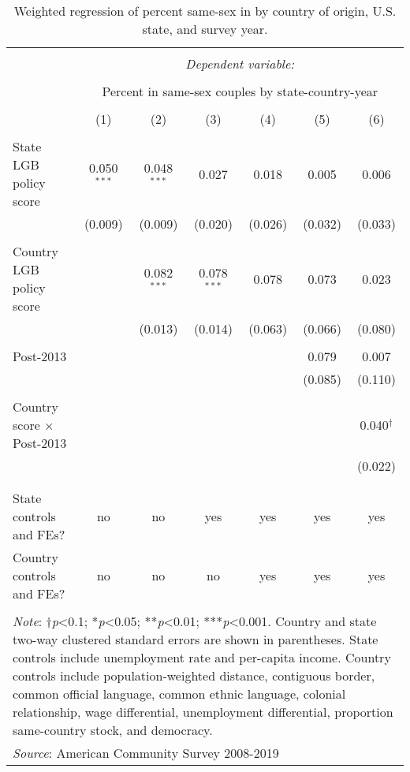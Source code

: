 \documentclass[
  11pt,
]{article}
\begin{document}
\begin{table}[H] \centering 
  \caption{Weighted regression of percent same-sex in by country of origin, U.S. state, and survey year. } 
  \label{tab:state-props} 
\begin{tabular}{@{\extracolsep{5pt}}lcccccc} 
\\[-1.8ex]\hline 
\hline \\[-1.8ex] 
 & \multicolumn{6}{c}{\textit{Dependent variable:}} \\ 
\cline{2-7} 
\\[-1.8ex] & \multicolumn{6}{c}{Percent in same-sex couples by state-country-year} \\ 
\\[-1.8ex] & (1) & (2) & (3) & (4) & (5) & (6)\\ 
\hline \\[-1.8ex] 
 State LGB policy score & 0.050$^{***}$ & 0.048$^{***}$ & 0.027 & 0.018 & 0.005 & 0.006 \\ 
  & (0.009) & (0.009) & (0.020) & (0.026) & (0.032) & (0.033) \\ 
  & & & & & & \\ 
 Country LGB policy score &  & 0.082$^{***}$ & 0.078$^{***}$ & 0.078 & 0.073 & 0.023 \\ 
  &  & (0.013) & (0.014) & (0.063) & (0.066) & (0.080) \\ 
  & & & & & & \\ 
 Post-2013 &  &  &  &  & 0.079 & 0.007 \\ 
  &  &  &  &  & (0.085) & (0.110) \\ 
  & & & & & & \\ 
 Country score × Post-2013 &  &  &  &  &  & 0.040$^{†}$ \\ 
  &  &  &  &  &  & (0.022) \\ 
  & & & & & & \\ 
\hline \\[-1.8ex] 
State controls and FEs? & no & no & yes & yes & yes & yes \\ 
Country controls and FEs? & no & no & no & yes & yes & yes \\ 
\hline 
\hline \\[-1.8ex] 
\multicolumn{7}{l}{\parbox[t]{.8\textwidth}{\textit{Note}: †\textit{p}<0.1; *\textit{p}<0.05; **\textit{p}<0.01; ***\textit{p}<0.001. Country and state two-way clustered standard errors are shown in parentheses. State controls include unemployment rate and per-capita income. Country controls include population-weighted distance, contiguous border, common official language, common ethnic language, colonial relationship, wage differential, unemployment differential, proportion same-country stock, and democracy.}} \\ 
\multicolumn{7}{l}{\textit{Source}: American Community Survey 2008-2019} \\ 
\end{tabular} 
\end{table}
\end{document}
